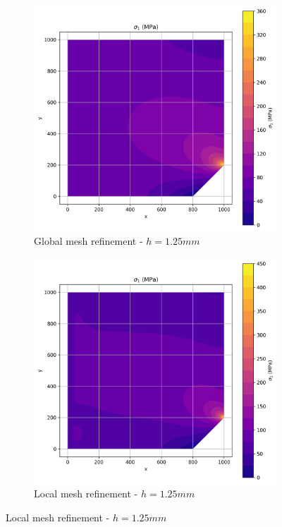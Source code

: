 \begin{figure}[H]
  \centering
  \begin{subfigure}[b]{0.45\textwidth}
    \centering
    \includegraphics[width=\textwidth]{GRAFICOS/Quad9/1.25mm_global/resultados - sigma_1.png}
    \caption{Global mesh refinement - $h=1.25mm$}
    \label{fig:img13}
  \end{subfigure}
  \hfill
  \begin{subfigure}[b]{0.45\textwidth}
    \centering
    \includegraphics[width=\textwidth]{GRAFICOS/Quad9/1.25mm_local/resultados - sigma_1.png}
    \caption{Local mesh refinement - $h=1.25mm$}
    \label{fig:img23}
  \end{subfigure}
\end{figure}

